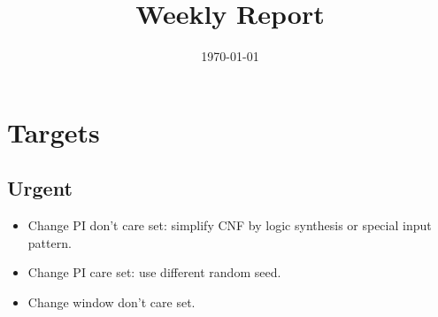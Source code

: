 \documentclass{rpt}
\title{Weekly Report}
\author{}
\date{\today}
\begin{document}
\maketitle

\section{Targets}

\subsection{Urgent}
\begin{itemize}
    \item
        Change PI don't care set: simplify CNF by logic synthesis or special input pattern.
    \item
        Change PI care set: use different random seed.
    \item
        Change window don't care set.
\end{itemize}
\end{document}
